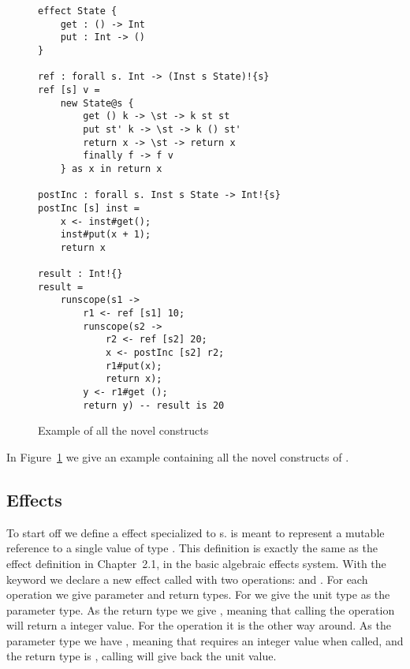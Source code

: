 \begin{figure}
\caption{Example of all the novel constructs}
\begin{verbatim}
effect State {
	get : () -> Int
	put : Int -> ()
}

ref : forall s. Int -> (Inst s State)!{s}
ref [s] v =
	new State@s {
		get () k -> \st -> k st st
		put st' k -> \st -> k () st'
		return x -> \st -> return x
		finally f -> f v
	} as x in return x

postInc : forall s. Inst s State -> Int!{s}
postInc [s] inst =
	x <- inst#get();
	inst#put(x + 1);
	return x

result : Int!{}
result =
	runscope(s1 ->
		r1 <- ref [s1] 10;
		runscope(s2 ->
			r2 <- ref [s2] 20;
			x <- postInc [s2] r2;
			r1#put(x);
			return x);
		y <- r1#get ();
		return y) -- result is 20
\end{verbatim}
\label{fig:example1}
\end{figure}

In Figure~\ref{fig:example1} we give an example containing all the novel constructs of \lang{}.

\subsection{Effects}

To start off we define a  effect specialized to s.
 is meant to represent a mutable reference to a single value of type .
This definition is exactly the same as the  effect definition in Chapter~2.1, in the basic algebraic effects system.
With the  keyword we declare a new effect called  with two operations:  and .
For each operation we give parameter and return types. For  we give the unit type \ident{()} as the parameter type.
As the return type we give , meaning that calling the  operation will return a integer value.
For the  operation it is the other way around.
As the parameter type we have , meaning that  requires an integer value when called, and the return type is \ident{()}, calling  will give back the unit value.

